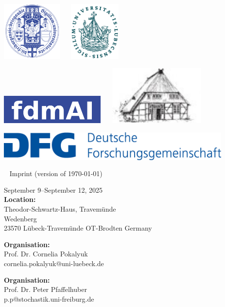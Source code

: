 \documentclass[12pt,a4paper]{article}
\makeatletter
\newcommand{\Impressum}{%
{\scriptsize
\fboxsep0pt
{\begin{minipage}[b]{.33\textwidth}
September 9--September 12, 2025\\[.5ex]
\textbf{Location: }\\
Theodor-Schwartz-Haus, Travemünde\\
Wedenberg \\
23570 Lübeck-Travemünde OT-Brodten
Germany
\end{minipage}}
\hfill
{\begin{minipage}[b]{.36\textwidth}
\textbf{Organisation: }\\
Prof. Dr. Cornelia Pokalyuk \\
cornelia.pokalyuk@uni-luebeck.de  
\end{minipage}}%
\hfill
{\begin{minipage}[b]{.28\textwidth}
\textbf{Organisation: }\\
Prof. Dr. Peter Pfaffelhuber\\
p.p@stochastik.uni-freiburg.de
\end{minipage}} 
}}
\makeatother
\begin{document}
\includegraphics[height=3cm]{UFR-vorlage-designsystem-typo-farben-V1.99-768x543.png}
~\hfill ~
\includegraphics[height=3cm]{Siegel-Uni-Luebeck.svg.png}
~\hfill ~

\bigskip
\includegraphics[height=1.5cm]{fdmai.png}
~\hfill ~
\includegraphics[height=3cm]{logo-tsh.jpg}
~\hfill ~

\bigskip
\bigskip
\bigskip
\bigskip

\includegraphics[height=1.5cm]{dfg.jpg}

 ~
 \vfill
 {\scriptsize Imprint {\tiny (version of \today) }} \\[1ex]
 \Impressum
 
 \bigskip
\end{document}
